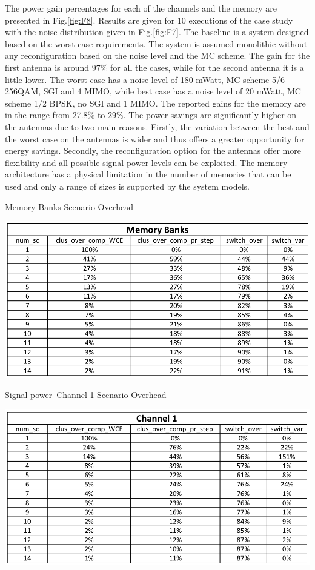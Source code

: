	The power gain percentages for each of the channels and the memory are presented in Fig.\ref{fig:F8}. Results are given for 10 executions of the case study with the noise distribution given in Fig.\ref{fig:F7}. The baseline is a system designed based on the worst-case requirements. The system is assumed monolithic without any reconfiguration based on the noise level and the MC scheme. The gain for the first antenna is around 97\% for all the cases, while for the second antenna it is a little lower. The worst case has a noise level of 180 mWatt, MC scheme 5/6 256QAM, SGI and 4 MIMO, while best case has a noise level of 20 mWatt, MC scheme 1/2 BPSK, no SGI and 1 MIMO. The reported gains for the memory are in the range from 27.8\% to 29\%. The power savings are significantly higher on the antennas due to two main reasons. Firstly, the variation between the best and the worst case on the antennas is wider and thus offers a greater opportunity for energy savings. Secondly, the reconfiguration option for the antennas offer more flexibility and all possible signal power levels can be exploited. The memory architecture has a physical limitation in the number of memories that can be used and only a range of sizes is supported by the system models.

\begin{table}
\centering
	\caption{Memory Banks Scenario Overhead}
	\label{tab:F1}
	\includegraphics[width=\textwidth]{F/tab1.png}
\end{table} 

\begin{table}
\centering
	\caption{Signal power–Channel 1 Scenario Overhead}
	\label{tab:F2}
	\includegraphics[width=\textwidth]{F/tab2.png}
\end{table} 

